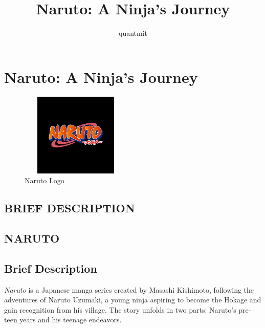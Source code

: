 \documentclass[
  letterpaper,
  DIV=11,
  numbers=noendperiod]{scrartcl}
\title{Naruto: A Ninja's Journey}
\author{quantmit}
\date{}
\begin{document}
\maketitle
\ifdefined\Shaded\renewenvironment{Shaded}{\begin{tcolorbox}[sharp corners, frame hidden, boxrule=0pt, enhanced, borderline west={3pt}{0pt}{shadecolor}, interior hidden, breakable]}{\end{tcolorbox}}\fi

\hypertarget{naruto-a-ninjas-journey}{%
\section{Naruto: A Ninja's Journey}\label{naruto-a-ninjas-journey}}

\begin{figure}

{\centering \includegraphics[width=2.08333in,height=1.5625in]{quarto2_files/mediabag/5f60349f6b0980548907.jpg}

}

\caption{Naruto Logo}

\end{figure}

\subsection{BRIEF DESCRIPTION}

\subsection{NARUTO}

\subsection{Brief Description}

\emph{Naruto} is a Japanese manga series created by Masashi Kishimoto,
following the adventures of Naruto Uzumaki, a young ninja aspiring to
become the Hokage and gain recognition from his village. The story
unfolds in two parts: Naruto's pre-teen years and his teenage endeavors.
\end{document}
